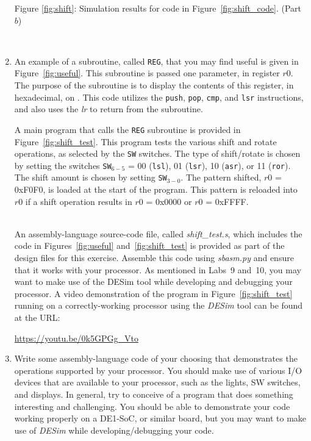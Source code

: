 \documentclass[epsfig,10pt,fullpage]{article} \addtolength{\textwidth}{1.5in}
\newcommand{\red}[1]{{\color{red}\sf{#1}}}
\begin{document}
\begin{enumerate}
\begin{minipage}[h]{15.5 cm}
\begin{center}
Figure \ref{fig:shift}: Simulation results for code in Figure~\ref{fig:shift_code}. (Part $b$)
\end{center}
\end{minipage}

~\\
\item An example of a subroutine, called \texttt{REG}, that you may find 
useful is given in Figure~\ref{fig:useful}. This subroutine is passed one parameter, 
in register $r0$. The purpose of the subroutine is to display the contents of this register, 
in hexadecimal, on \red{HEX3-0}. This code utilizes the \texttt{push}, 
\texttt{pop}, \texttt{cmp}, and \texttt{lsr} instructions, and also uses the {\it lr} to 
return from the subroutine.

A main program that calls the \texttt{REG} subroutine is provided in 
Figure~\ref{fig:shift_test}. This program tests the various shift and rotate operations,
as selected by the \texttt{SW} switches. The type of shift/rotate is chosen by setting the
switches \texttt{SW}$_{6-5}$ = 00 (\texttt{lsl}), 01 (\texttt{lsr}), 10 (\texttt{asr}),
or 11 (\texttt{ror}). The shift amount is chosen by setting \texttt{SW}$_{3-0}$. The
pattern shifted, $r0$ = 0xF0F0, is loaded at the start of the program. This pattern is
reloaded into $r0$ if a shift operation results in $r0$ = 0x0000 or $r0$ = 0xFFFF.

~\\
An assembly-language source-code file, called {\it shift\_test.s}, which includes the 
code in Figures~\ref{fig:useful} 
and~\ref{fig:shift_test} is provided as part of the design files for this exercise.
Assemble this code using {\it sbasm.py} and ensure that it works with your 
processor. As mentioned in Labs~9 and~10, you may want to make use of the DESim tool while
developing and debugging your processor. A video demonstration of the program in 
Figure~\ref{fig:shift_test} running on a correctly-working processor
using the {\it DESim} tool can be found at the URL:  

\noindent
\url{https://youtu.be/0k5GPGg_Vto}

\item Write some assembly-language code of your choosing that demonstrates the operations 
supported by your processor. You should make use of various I/O devices 
that are available to your processor, such as the \red{LEDR} lights, SW switches, 
and \red{HEX} displays.  In general, try to conceive of a program that does something
interesting and challenging. You should be able to demonstrate your code working properly
on a DE1-SoC, or similar board, but you may want to make use of {\it DESim} while
developing/debugging your code.


\end{enumerate}
\end{document}
